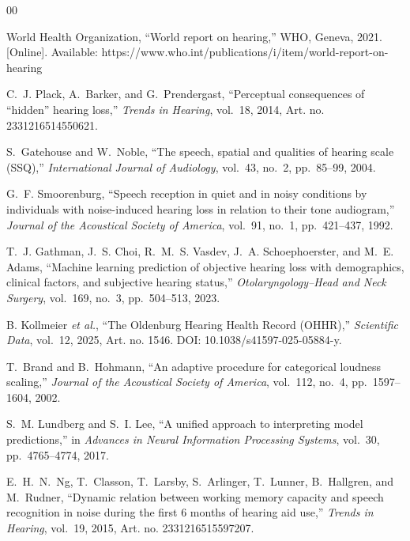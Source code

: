 \documentclass[conference]{IEEEtran}
\begin{document}
\begin{thebibliography}{00}

World Health Organization, ``World report on hearing,'' WHO, Geneva, 2021.
[Online]. Available: https://www.who.int/publications/i/item/world-report-on-hearing

C.~J. Plack, A.~Barker, and G.~Prendergast, ``Perceptual consequences of
``hidden'' hearing loss,'' \textit{Trends in Hearing}, vol.~18, 2014,
Art. no. 2331216514550621.

S.~Gatehouse and W.~Noble, ``The speech, spatial and qualities of hearing
scale (SSQ),'' \textit{International Journal of Audiology}, vol.~43,
no.~2, pp.~85--99, 2004.

G.~F. Smoorenburg, ``Speech reception in quiet and in noisy conditions by
individuals with noise-induced hearing loss in relation to their
tone audiogram,'' \textit{Journal of the Acoustical Society of America},
vol.~91, no.~1, pp.~421--437, 1992.

T.~J. Gathman, J.~S. Choi, R.~M.~S. Vasdev, J.~A. Schoephoerster, and
M.~E. Adams, ``Machine learning prediction of objective hearing loss with
demographics, clinical factors, and subjective hearing status,''
\textit{Otolaryngology--Head and Neck Surgery}, vol.~169, no.~3,
pp.~504--513, 2023.

B. Kollmeier \textit{et al.}, ``The Oldenburg Hearing Health Record (OHHR),''
\textit{Scientific Data}, vol.~12, 2025, Art. no. 1546.
DOI: 10.1038/s41597-025-05884-y.

T.~Brand and B.~Hohmann, ``An adaptive procedure for categorical loudness
scaling,'' \textit{Journal of the Acoustical Society of America}, vol.~112,
no.~4, pp.~1597--1604, 2002.

S.~M. Lundberg and S.~I. Lee, ``A unified approach to interpreting model
predictions,'' in \textit{Advances in Neural Information Processing Systems},
vol.~30, pp.~4765--4774, 2017.

E.~H.~N.~Ng, T.~Classon, T.~Larsby, S.~Arlinger, T.~Lunner,
B.~Hallgren, and M.~Rudner, ``Dynamic relation between working memory
capacity and speech recognition in noise during the first 6 months of hearing
aid use,'' \textit{Trends in Hearing}, vol.~19, 2015,
Art. no. 2331216515597207.


\end{thebibliography}
\end{document}
